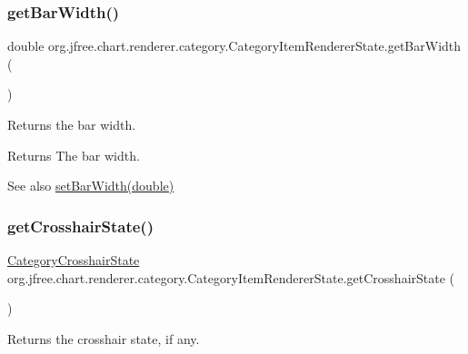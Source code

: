 \subsubsection{\texorpdfstring{get\+Bar\+Width()}{getBarWidth()}}
{\footnotesize\ttfamily double org.\+jfree.\+chart.\+renderer.\+category.\+Category\+Item\+Renderer\+State.\+get\+Bar\+Width (\begin{DoxyParamCaption}{ }\end{DoxyParamCaption})}

Returns the bar width.

\begin{DoxyReturn}{Returns}
The bar width.
\end{DoxyReturn}
\begin{DoxySeeAlso}{See also}
\mbox{\hyperlink{classorg_1_1jfree_1_1chart_1_1renderer_1_1category_1_1_category_item_renderer_state_afab9715d8005aec6509212dbac5575b8}{set\+Bar\+Width(double)}} 
\end{DoxySeeAlso}
\mbox{\label{classorg_1_1jfree_1_1chart_1_1renderer_1_1category_1_1_category_item_renderer_state_a1643863db46b2b247a24e7d297b512e1}} 
\subsubsection{\texorpdfstring{get\+Crosshair\+State()}{getCrosshairState()}}
{\footnotesize\ttfamily \mbox{\hyperlink{classorg_1_1jfree_1_1chart_1_1plot_1_1_category_crosshair_state}{Category\+Crosshair\+State}} org.\+jfree.\+chart.\+renderer.\+category.\+Category\+Item\+Renderer\+State.\+get\+Crosshair\+State (\begin{DoxyParamCaption}{ }\end{DoxyParamCaption})}

Returns the crosshair state, if any.

